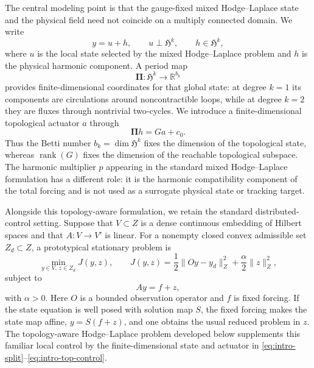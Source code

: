 \documentclass{article}
\newcommand{\R} {\mathbb R}
\newcommand{\HH}{\mathfrak H}
\newcommand{\Piop}{\boldsymbol\Pi}
\begin{document}
The central modeling point is that the gauge-fixed mixed Hodge--Laplace state and the physical field need not coincide on a multiply connected domain.  We write
\begin{equation}\label{eq:intro-split}
    y=u+h, \qquad u\perp \HH^k, \qquad h\in\HH^k,
\end{equation}
where $u$ is the local state selected by the mixed Hodge--Laplace problem and $h$ is the physical harmonic component.  A period map
\begin{equation}\label{eq:intro-period-map}
    \Piop:\HH^k\longrightarrow\R^{b_k}
\end{equation}
provides finite-dimensional coordinates for that global state: at degree $k=1$ its components are circulations around noncontractible loops, while at degree $k=2$ they are fluxes through nontrivial two-cycles.  We introduce a finite-dimensional topological actuator $a$ through
\begin{equation}\label{eq:intro-top-control}
    \Piop h=Ga+c_0.
\end{equation}
Thus the Betti number $b_k=\dim\HH^k$ fixes the dimension of the topological state, whereas $\operatorname{rank}(G)$ fixes the dimension of the reachable topological subspace.  The harmonic multiplier $p$ appearing in the standard mixed Hodge--Laplace formulation has a different role: it is the harmonic compatibility component of the total forcing and is not used as a surrogate physical state or tracking target.

Alongside this topology-aware formulation, we retain the standard distributed-control setting.  Suppose that $V\subset Z$ is a dense continuous embedding of Hilbert spaces and that $A:V\to V'$ is linear.  For a nonempty closed convex admissible set $Z_d\subset Z$, a prototypical stationary problem is
\begin{equation}
    \min_{y\in V,\,z\in Z_d}J(y,z),\qquad
    J(y,z)=\frac12\|Oy-y_d\|_Z^2+\frac\alpha2\|z\|_Z^2,
\end{equation}
subject to
\begin{equation}
    Ay=f+z,
\end{equation}
with $\alpha>0$.  Here $O$ is a bounded observation operator and $f$ is fixed forcing.  If the state equation is well posed with solution map $S$, the fixed forcing makes the state map affine, $y=S(f+z)$, and one obtains the usual reduced problem in $z$.  The topology-aware Hodge--Laplace problem developed below supplements this familiar local control by the finite-dimensional state and actuator in \eqref{eq:intro-split}--\eqref{eq:intro-top-control}.
\end{document}
